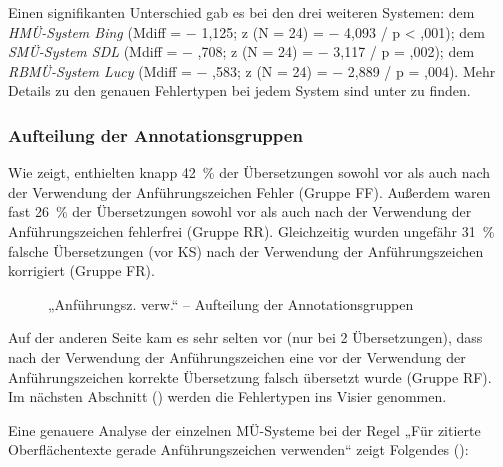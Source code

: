 Einen signifikanten Unterschied gab es bei den drei weiteren Systemen: dem \textit{HMÜ-System Bing}\textbf{ }(Mdiff = $-$ 1,125; z (N = 24) = $-$ 4,093 / p < ,001); dem \textit{SMÜ-System SDL} (Mdiff = $-$ ,708; z (N = 24) = $-$ 3,117 / p = ,002); dem \textit{RBMÜ-System Lucy} (Mdiff = $-$ ,583; z (N = 24) = $-$ 2,889 / p = ,004). Mehr Details zu den genauen Fehlertypen bei jedem System sind unter  zu finden.

\subsubsection{\label{sec:5.3.1.2}Aufteilung der Annotationsgruppen}

Wie  zeigt, enthielten knapp 42~\% der Übersetzungen sowohl vor als auch nach der Verwendung der Anführungszeichen Fehler (Gruppe FF). Außerdem waren fast 26~\% der Übersetzungen sowohl vor als auch nach der Verwendung der Anführungszeichen fehlerfrei (Gruppe RR). Gleichzeitig wurden ungefähr 31~\% falsche Übersetzungen (vor KS) nach der Verwendung der Anführungszeichen korrigiert (Gruppe FR).


\begin{figure}


\caption{\label{fig:05:23} „Anführungsz. verw.“ -- Aufteilung der Annotationsgruppen}
\end{figure}

Auf der anderen Seite kam es sehr selten vor (nur bei 2 Übersetzungen), dass nach der Verwendung der Anführungszeichen eine vor der Verwendung der Anführungszeichen korrekte Übersetzung falsch übersetzt wurde (Gruppe RF). Im nächsten Abschnitt () werden die Fehlertypen ins Visier genommen.


Eine genauere Analyse der einzelnen MÜ-Systeme bei der Regel „Für zitierte Oberflächentexte gerade Anführungszeichen verwenden“ zeigt Folgendes ():


